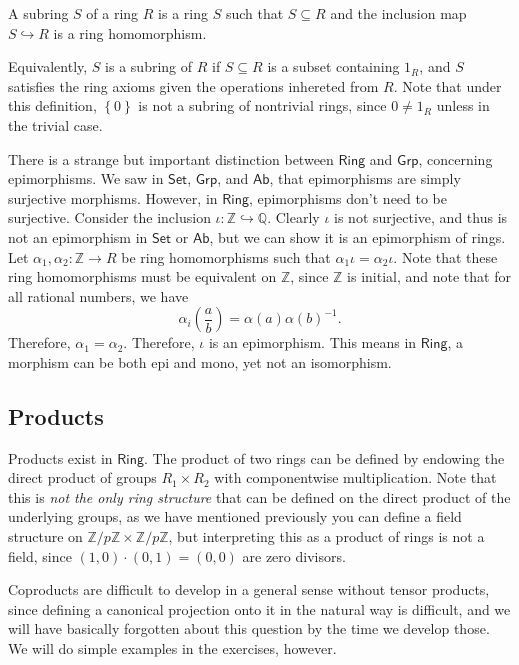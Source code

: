 \begin{definition}[Subring]\label{dfn:3.2.3}
	A subring $S$ of a ring $R$ is a ring $S$ such that $S\subseteq R$ and the inclusion map $S\hookrightarrow R$ is a ring homomorphism.
\end{definition}

Equivalently, $S$ is a subring of $R$ if $S\subseteq R$ is a subset containing $1_R$, and $S$ satisfies the ring axioms given the operations inhereted from $R$. Note that under this definition, $\left\{ 0 \right\} $ is not a subring of nontrivial rings, since $0\neq 1_R$ unless in the trivial case.

There is a strange but important distinction between $\mathsf{Ring}$ and $\mathsf{Grp}$, concerning epimorphisms. We saw in $\mathsf{Set}$, $\mathsf{Grp}$, and $\mathsf{Ab}$, that epimorphisms are simply surjective morphisms. However, in $\mathsf{Ring}$, epimorphisms don't need to be surjective. Consider the inclusion $\iota : \mathbb{Z} \hookrightarrow \mathbb{Q}$. Clearly $\iota $ is not surjective, and thus is not an epimorphism in $\mathsf{Set}$ or $\mathsf{Ab}$, but we can show it is an epimorphism of rings. Let $\alpha_1,\alpha_2 : \mathbb{Z} \to R$ be ring homomorphisms such that $\alpha_1\iota =\alpha_2\iota $. Note that these ring homomorphisms must be equivalent on $\mathbb{Z}$, since $\mathbb{Z}$ is initial, and note that for all  rational numbers, we have
\[
	\alpha_i \left( \frac{a}{b} \right) =\alpha(a)\alpha(b)^{-1}
.\]
Therefore, $\alpha_1 = \alpha_2$. Therefore, $\iota $ is an epimorphism. This means in $\mathsf{Ring}$, a morphism can be both epi and mono, yet not an isomorphism.

\subsection{Products}
Products exist in $\mathsf{Ring}$. The product of two rings can be defined by endowing the direct product of groups $R_1\times R_2$ with componentwise multiplication. Note that this is \emph{not the only ring structure} that can be defined on the direct product of the underlying groups, as we have mentioned previously you can define a field structure on $\mathbb{Z}/p\mathbb{Z}\times \mathbb{Z}/p\mathbb{Z}$, but interpreting this as a product of rings is not a field, since $(1,0)\cdot (0,1)=(0,0)$ are zero divisors.

Coproducts are difficult to develop in a general sense without tensor products, since defining a canonical projection onto it in the natural way is difficult, and we will have basically forgotten about this question by the time we develop those. We will do simple examples in the exercises, however.

